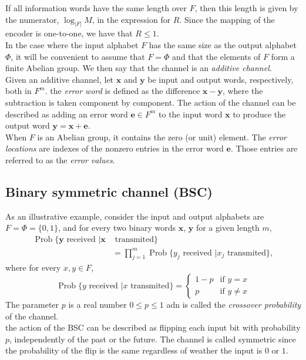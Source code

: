 If all information words have the same length over $F$, then this length is given by the numerator, $\log_{|F|}M$, in the expression for $R$. Since the mapping of the encoder is one-to-one, we have that $R\leq 1$.\\
In the case where the input alphabet $F$ has the same size as the output alphabet $\Phi$, it will be convenient to assume that $F=\Phi$ and that the elements of $F$ form a finite Abelian group. We then say that the channel is an \textit{additive channel}.\\
\indent Given an additive channel, let $\mathbf{x}$ and $\mathbf{y}$ be input and output words, respectively, both in $F^m$. the \textit{error word} is defined as the difference $\mathbf{x}-\mathbf{y}$, where the subtraction is taken component by component. The action of the channel can be described as adding an error word $\mathbf{e}\in F^m$ to the input word $\mathbf{x}$ to produce the output word $\mathbf{y} = \mathbf{x}+\mathbf{e}$.\\
\indent When $F$ is an Abelian group, it contains the zero (or unit) element. The \textit{error locations} are indexes of the nonzero entries in the error word $\mathbf{e}$. Those entries are referred to as the \textit{error values}.
\subsection{Binary symmetric channel (BSC)}
As an illustrative example, consider the input and output alphabets are $F=\Phi=\{0,1\}$, and for every two binary words $\mathbf{x}$, $\mathbf{y}$ for a given length $m$, 
\begin{align}
\operatorname{Prob}\{\mathbf{y}\text{ received }|\mathbf{x}&\text{ transmited}\} \nonumber \\
&=\prod_{j=1}^{m} \operatorname{Prob}\{y_j\text{ received }|x_j\text{ transmited}\},
\end{align}
where for every $x,y\in F$,
\begin{equation}
\operatorname{Prob}\{y\text{ received }|x\text{ transmited}\} = \left\{
    \begin{array}{ll}
        1-p & \mbox{if } y=x \\
        p & \mbox{if } y\neq x
    \end{array}
\right.
\end{equation}
The parameter $p$ is a real number $0\leq p\leq 1$ adn is called the \textit{crossover probability} of the channel.\\
\indent the action of the BSC can be described as flipping each input bit with probability $p$, independently of the past or the future. The channel is called symmetric since the probability of the flip is the same regardless of weather the input is $0$ or $1$.
